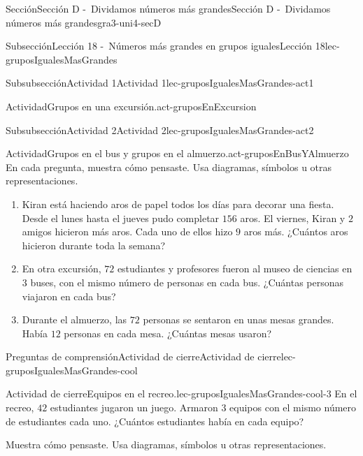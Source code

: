 \documentclass[twoside,10pt,]{article}
\begin{document}
\begin{sectionptx}{Sección}{Sección D -~Dividamos números más grandes}{}{Sección D -~Dividamos números más grandes}{}{}{gra3-uni4-secD}
\begin{subsectionptx}{Subsección}{Lección 18 -~Números más grandes en grupos iguales}{}{Lección 18}{}{}{lec-gruposIgualesMasGrandes}
\begin{subsubsectionptx}{Subsubsección}{Actividad 1}{}{Actividad 1}{}{}{lec-gruposIgualesMasGrandes-act1}
\begin{activity}{Actividad}{Grupos en una excursión.}{act-gruposEnExcursion}
\begin{image}{0.15}{0.7}{0.15}{}
\end{image}%
\end{activity}%
\end{subsubsectionptx}
%
%
\typeout{************************************************}
\typeout{************************************************}
%
\begin{subsubsectionptx}{Subsubsección}{Actividad 2}{}{Actividad 2}{}{}{lec-gruposIgualesMasGrandes-act2}
\begin{activity}{Actividad}{Grupos en el bus y grupos en el almuerzo.}{act-gruposEnBusYAlmuerzo}%
En cada pregunta, muestra cómo pensaste. Usa diagramas, símbolos u otras representaciones.%
%
\begin{enumerate}
\item{}Kiran está haciendo aros de papel todos los días para decorar una fiesta. Desde el lunes hasta el jueves pudo completar \(156\) aros. El viernes, Kiran y \(2\) amigos hicieron más aros. Cada uno de ellos hizo \(9\) aros más. ¿Cuántos aros hicieron durante toda la semana?%
\item{}En otra excursión, \(72\) estudiantes y profesores fueron al museo de ciencias en \(3\) buses, con el mismo número de personas en cada bus. ¿Cuántas personas viajaron en cada bus?%
\item{}Durante el almuerzo, las \(72\) personas se sentaron en unas mesas grandes. Había \(12\) personas en cada mesa. ¿Cuántas mesas usaron?%
\end{enumerate}
\end{activity}%
\end{subsubsectionptx}
%
%
\typeout{************************************************}
\typeout{************************************************}
%
\begin{reading-questions-subsubsection}{Preguntas de comprensión}{Actividad de cierre}{}{Actividad de cierre}{}{}{lec-gruposIgualesMasGrandes-cool}
\begin{project}{Actividad de cierre}{Equipos en el recreo.}{lec-gruposIgualesMasGrandes-cool-3}%
En el recreo, \(42\) estudiantes jugaron un juego. Armaron \(3\) equipos con el mismo número de estudiantes cada uno. ¿Cuántos estudiantes había en cada equipo?%
\par
Muestra cómo pensaste. Usa diagramas, símbolos u otras representaciones.%
\end{project}%
\end{reading-questions-subsubsection}
\end{subsectionptx}

\end{sectionptx}
\end{document}
